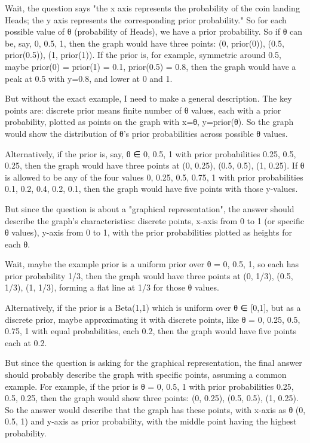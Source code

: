Wait, the question says "the x axis represents the probability of the coin landing Heads; the y axis represents the corresponding prior probability." So for each possible value of θ (probability of Heads), we have a prior probability. So if θ can be, say, 0, 0.5, 1, then the graph would have three points: (0, prior(0)), (0.5, prior(0.5)), (1, prior(1)). If the prior is, for example, symmetric around 0.5, maybe prior(0) = prior(1) = 0.1, prior(0.5) = 0.8, then the graph would have a peak at 0.5 with y=0.8, and lower at 0 and 1.

But without the exact example, I need to make a general description. The key points are: discrete prior means finite number of θ values, each with a prior probability, plotted as points on the graph with x=θ, y=prior(θ). So the graph would show the distribution of θ's prior probabilities across possible θ values.

Alternatively, if the prior is, say, θ ∈ {0, 0.5, 1} with prior probabilities 0.25, 0.5, 0.25, then the graph would have three points at (0, 0.25), (0.5, 0.5), (1, 0.25). If θ is allowed to be any of the four values 0, 0.25, 0.5, 0.75, 1 with prior probabilities 0.1, 0.2, 0.4, 0.2, 0.1, then the graph would have five points with those y-values.

But since the question is about a "graphical representation", the answer should describe the graph's characteristics: discrete points, x-axis from 0 to 1 (or specific θ values), y-axis from 0 to 1, with the prior probabilities plotted as heights for each θ.

Wait, maybe the example prior is a uniform prior over θ = 0, 0.5, 1, so each has prior probability 1/3, then the graph would have three points at (0, 1/3), (0.5, 1/3), (1, 1/3), forming a flat line at 1/3 for those θ values.

Alternatively, if the prior is a Beta(1,1) which is uniform over θ ∈ [0,1], but as a discrete prior, maybe approximating it with discrete points, like θ = 0, 0.25, 0.5, 0.75, 1 with equal probabilities, each 0.2, then the graph would have five points each at 0.2.

But since the question is asking for the graphical representation, the final answer should probably describe the graph with specific points, assuming a common example. For example, if the prior is θ = 0, 0.5, 1 with prior probabilities 0.25, 0.5, 0.25, then the graph would show three points: (0, 0.25), (0.5, 0.5), (1, 0.25). So the answer would describe that the graph has these points, with x-axis as θ (0, 0.5, 1) and y-axis as prior probability, with the middle point having the highest probability.

